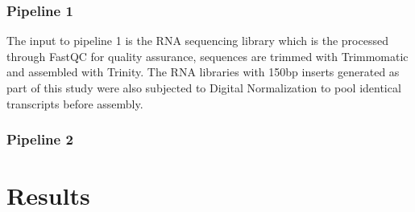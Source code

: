 \documentclass[12pt]{article}
\begin{document}
\subsubsection*{Pipeline 1}
The input to pipeline 1 is the RNA sequencing library which is the processed through FastQC for quality assurance, sequences are trimmed with Trimmomatic and assembled with Trinity. The RNA libraries with 150bp inserts generated as part of this study were also subjected to Digital Normalization to pool identical transcripts before assembly.                                                                                                                                                                                                                                                                                                                                                                                                                                                                                                                                                                                                                                                                                                                                                                                                                                                                                                                                                                                                                                                                                                                                                                                                                                                                                                                                           
\subsubsection*{Pipeline 2}


\newpage
\section{Results}
\end{document}
